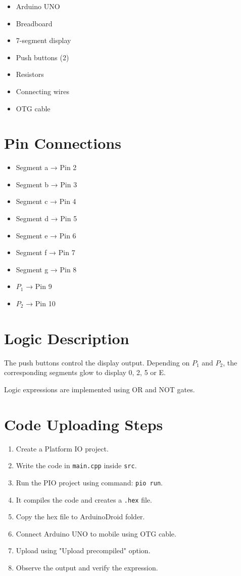 \documentclass{article}
\begin{document}
\begin{itemize}
\item Arduino UNO
\item Breadboard
\item 7-segment display
\item Push buttons (2)
\item Resistors
\item Connecting wires
\item OTG cable
\end{itemize}

\section*{Pin Connections}

\begin{itemize}
\item Segment a → Pin 2
\item Segment b → Pin 3
\item Segment c → Pin 4
\item Segment d → Pin 5
\item Segment e → Pin 6
\item Segment f → Pin 7
\item Segment g → Pin 8
\item $P_1$ → Pin 9
\item $P_2$ → Pin 10
\end{itemize}

\section*{Logic Description}

The push buttons control the display output.  
Depending on $P_1$ and $P_2$, the corresponding segments glow to display 0, 2, 5 or E.

Logic expressions are implemented using OR and NOT gates.

\section*{Code Uploading Steps}

\begin{enumerate}
\item Create a Platform IO project.
\item Write the code in \texttt{main.cpp} inside \texttt{src}.
\item Run the PIO project using command: \texttt{pio run}.
\item It compiles the code and creates a \texttt{.hex} file.
\item Copy the hex file to ArduinoDroid folder.
\item Connect Arduino UNO to mobile using OTG cable.
\item Upload using "Upload precompiled" option.
\item Observe the output and verify the expression.
\end{enumerate}
\end{document}
